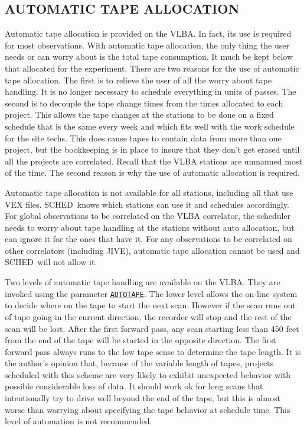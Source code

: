 \documentclass{report}
\newcommand{\schedb}{{\sc SCHED~}}
\begin{document}
\subsection{\label{SSSEC:AUTOTAPE}AUTOMATIC TAPE ALLOCATION}

Automatic tape allocation is provided on the VLBA.  In fact, its
use is required for most observations.  With automatic tape
allocation, the only thing the user needs or can worry about is the
total tape consumption.  It much be kept below that allocated for the
experiment.  There are two reasons for the use of automatic tape
allocation.  The first is to relieve the user of all the worry about
tape handling.  It is no longer necessary to schedule everything in
units of passes.  The second is to decouple the tape change times from
the times allocated to each project.  This allows the tape changes at
the stations to be done on a fixed schedule that is the same every
week and which fits well with the work schedule for the site techs.
This does cause tapes to contain data from more than one project, but
the bookkeeping is in place to insure that they don't get erased until
all the projects are correlated.  Recall that the VLBA stations are
unmanned most of the time.  The second reason is why the use of
automatic allocation is required.

Automatic tape allocation is not available for all stations, including
all that use VEX files.  \schedb knows which stations can use it and
schedules accordingly.  For global observations to be correlated on
the VLBA correlator, the scheduler needs to worry about tape handling
at the stations without auto allocation, but can ignore it for the
ones that have it.  For any observations to be correlated on other
correlators (including JIVE), automatic tape allocation cannot be used
and \schedb will not allow it.

Two levels of automatic tape handling are available on the VLBA.  They
are invoked using the parameter 
{\hyperref[MP:AUTOTAPE]{{\tt AUTOTAPE}}}.
The lower level allows the on-line system to decide
where on the tape to start the next scan.  However if the scan runs
out of tape going in the current direction, the recorder will stop and
the rest of the scan will be lost.  After the first forward pass, any
scan starting less than 450 feet from the end of the tape will be
started in the opposite direction.  The first forward pass always runs
to the low tape sense to determine the tape length.  It is the
author's opinion that, because of the variable length of tapes,
projects scheduled with this scheme are very likely to exhibit
unexpected behavior with possible considerable loss of data.  It
should work ok for long scans that intentionally try to drive well
beyond the end of the tape, but this is almost worse than worrying
about specifying the tape behavior at schedule time.  This level of
automation is not recommended.
\end{document}
